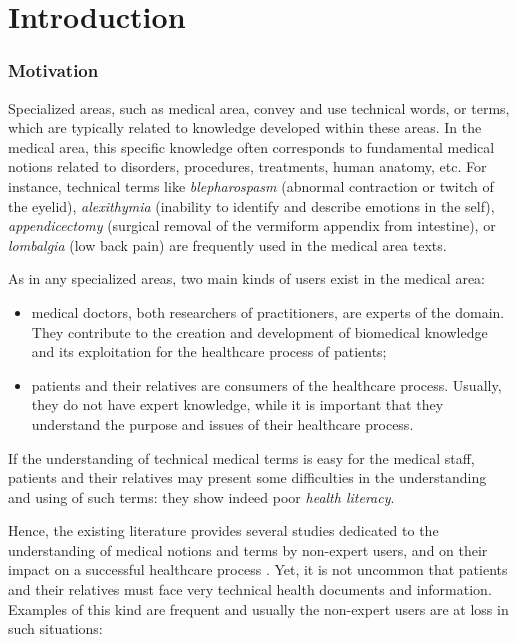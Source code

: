 \chapter{Introduction}

\subsection{Motivation}
Specialized areas, such as medical area, convey and use technical words, or terms, which are typically related to knowledge developed within these areas. In the medical area, this specific knowledge often corresponds to fundamental medical notions related to disorders, procedures, treatments, human anatomy, etc. For instance, technical terms like \textit{blepharospasm} (abnormal contraction or twitch of the eyelid), \textit{alexithymia} (inability to identify and describe emotions in the self), \textit{appendicectomy} (surgical removal of the vermiform appendix from intestine), or \textit{lombalgia} (low back pain) are frequently used in the medical area texts.

As in any specialized areas, two main kinds of users exist in the medical area:

\begin{itemize}
    \item medical doctors, both researchers of practitioners, are experts of the domain. They contribute to the creation and development of biomedical knowledge and its exploitation for the healthcare process of patients;
    
    \item  patients and their relatives are consumers of the healthcare process. Usually, they do not have expert knowledge, while it is important that they understand the purpose and issues of their healthcare process. 
\end{itemize}
If the understanding of technical medical terms is easy for the medical staff, patients and their relatives may present some difficulties in the understanding and using of such terms: they show indeed poor \textit{health literacy}. 

Hence, the existing literature provides several studies dedicated to the understanding of medical notions and terms by non-expert users, and on their impact on a successful healthcare process \citep{Mcgray-JAMIA2005,Eysenbach-JMIR2007}. Yet, it is not uncommon that patients and their relatives must face very technical health documents and information. Examples of this kind are frequent and usually the non-expert users are at loss in such situations:

